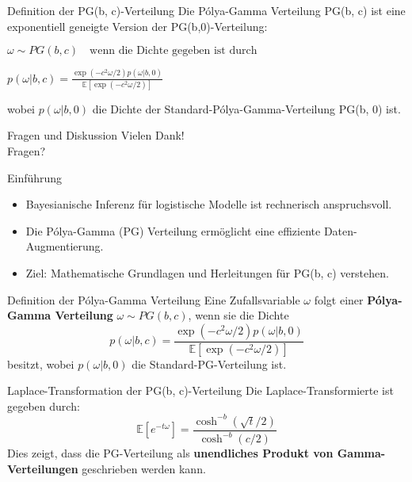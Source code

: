 \documentclass{beamer}
\begin{document}
\begin{frame}{Definition der PG(b, c)-Verteilung}
	Die Pólya-Gamma Verteilung PG(b, c) ist eine exponentiell geneigte Version der PG(b,0)-Verteilung:
	
	
	$\omega \sim PG(b, c) \quad \text{wenn die Dichte gegeben ist durch}$
	
	
	$p(\omega | b, c) = \frac{\exp(-c^2 \omega / 2) p(\omega | b, 0)}{\mathbb{E}[\exp(-c^2 \omega / 2)]}$
	
	
	wobei  $p(\omega | b, 0)$ die Dichte der Standard-Pólya-Gamma-Verteilung  PG(b, 0)  ist.
\end{frame}




\begin{frame}{Fragen und Diskussion}
  \centering
  \Huge{Vielen Dank! \\ Fragen?}
\end{frame}

\begin{frame}{Einführung}
	\begin{itemize}
		\item Bayesianische Inferenz für logistische Modelle ist rechnerisch anspruchsvoll.
		\item Die Pólya-Gamma (PG) Verteilung ermöglicht eine effiziente Daten-Augmentierung.
		\item Ziel: Mathematische Grundlagen und Herleitungen für PG(b, c) verstehen.
	\end{itemize}
\end{frame}

\begin{frame}{Definition der Pólya-Gamma Verteilung}
	Eine Zufallsvariable \( \omega \) folgt einer \textbf{Pólya-Gamma Verteilung} \( \omega \sim PG(b, c) \), wenn sie die Dichte
	\begin{equation}
		p(\omega | b, c) = \frac{\exp(-c^2 \omega / 2) p(\omega | b, 0)}{\mathbb{E}[\exp(-c^2 \omega / 2)]}
	\end{equation}
	besitzt, wobei \( p(\omega | b, 0) \) die Standard-PG-Verteilung ist.
\end{frame}

\begin{frame}{Laplace-Transformation der PG(b, c)-Verteilung}
	Die Laplace-Transformierte ist gegeben durch:
	\begin{equation}
		\mathbb{E} [e^{-t\omega}] = \frac{\cosh^{-b} (\sqrt{t}/2)}{\cosh^{-b} (c/2)}
	\end{equation}
	Dies zeigt, dass die PG-Verteilung als \textbf{unendliches Produkt von Gamma-Verteilungen} geschrieben werden kann.
\end{frame}
\end{document}
